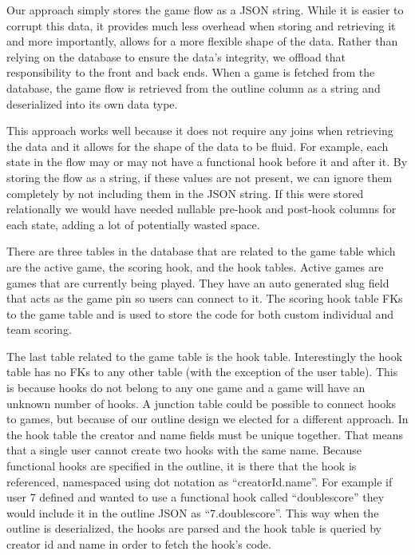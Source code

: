 \documentclass{article}
\begin{document}
    		Our approach simply stores the game flow as a JSON string. While it is easier to corrupt this data, it provides much less overhead when storing and retrieving it and more importantly, allows for a more flexible shape of the data. Rather than relying on the database to ensure the data's integrity, we offload that responsibility to the front and back ends. When a game is fetched from the database, the game flow is retrieved from the outline column as a string and deserialized into its own data type.
    		\smallskip
    		
    		This approach works well because it does not require any joins when retrieving the data and it allows for the shape of the data to be fluid. For example, each state in the flow may or may not have a functional hook before it and after it. By storing the flow as a string, if these values are not present, we can ignore them completely by not including them in the JSON string. If this were stored relationally we would have needed nullable pre-hook and post-hook columns for each state, adding a lot of potentially wasted space.
    		\smallskip
    		
    		There are three tables in the database that are related to the game table which are the active game, the scoring hook, and the hook tables. Active games are games that are currently being played. They have an auto generated slug field that acts as the game pin so users can connect to it. The scoring hook table FKs to the game table and is used to store the code for both custom individual and team scoring.
    		\smallskip
    		
    		The last table related to the game table is the hook table. Interestingly the hook table has no FKs to any other table (with the exception of the user table). This is because hooks do not belong to any one game and a game will have an unknown number of hooks. A junction table could be possible to connect hooks to games, but because of our outline design we elected for a different approach. In the hook table the creator and name fields must be unique together. That means that a single user cannot create two hooks with the same name. Because functional hooks are specified in the outline, it is there that the hook is referenced, namespaced using dot notation as ``creatorId.name''. For example if user 7 defined and wanted to use a functional hook called ``doublescore'' they would include it in the outline JSON as ``7.doublescore''. This way when the outline is deserialized, the hooks are parsed and the hook table is queried by creator id and name in order to fetch the hook's code.
    		
\end{document}

